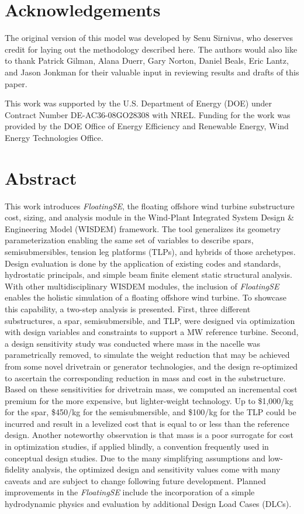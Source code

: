 \chapter*{Acknowledgements}
The original version of this model was developed by Senu Sirnivas, who
deserves credit for laying out the methodology described here.  The
authors would also like to thank Patrick Gilman, Alana Duerr, Gary
Norton, Daniel Beals, Eric Lantz, and Jason Jonkman for their valuable
input in reviewing results and drafts of this paper.

This work was supported by the U.S. Department of Energy (DOE) under
Contract Number DE-AC36-08GO28308 with NREL. Funding for the work was
provided by the DOE Office of Energy Efficiency and Renewable Energy,
Wind Energy Technologies Office.

\chapter*{Abstract}
This work introduces \textit{FloatingSE}, the floating offshore wind
turbine substructure cost, sizing, and analysis module in the Wind-Plant
Integrated System Design \& Engineering Model (WISDEM) framework.  The
tool generalizes its geometry parameterization enabling the same set of
variables to describe spars, semisubmersibles, tension leg platforms
(TLPs), and hybrids of those archetypes.  Design evaluation is done by
the application of existing codes and standards, hydrostatic principals,
and simple beam finite element static structural analysis.  With other
multidisciplinary WISDEM modules, the inclusion of \textit{FloatingSE}
enables the holistic simulation of a floating offshore wind turbine.  To
showcase this capability, a two-step analysis is presented.  First,
three different substructures, a spar, semisubmersible, and TLP, were
designed via optimization with design variables and constraints to
support a \unit[10]{MW} reference turbine. Second, a design sensitivity
study was conducted where mass in the nacelle was parametrically
removed, to simulate the weight reduction that may be achieved from some
novel drivetrain or generator technologies, and the design re-optimized
to ascertain the corresponding reduction in mass and cost in the
substructure.  Based on these sensitivities for drivetrain mass, we
computed an incremental cost premium for the more expensive, but
lighter-weight technology.  Up to \$1,000/kg for the spar, \$450/kg for
the semisubmersible, and \$100/kg for the TLP could be incurred and
result in a levelized cost that is equal to or less than the reference
design.  Another noteworthy observation is that mass is a poor surrogate
for cost in optimization studies, if applied blindly, a convention
frequently used in conceptual design studies.  Due to the many
simplifying assumptions and low-fidelity analysis, the optimized design
and sensitivity values come with many caveats and are subject to change
following future development.  Planned improvements in the
\textit{FloatingSE} include the incorporation of a simple hydrodynamic
physics and evaluation by additional Design Load Cases (DLCs).
